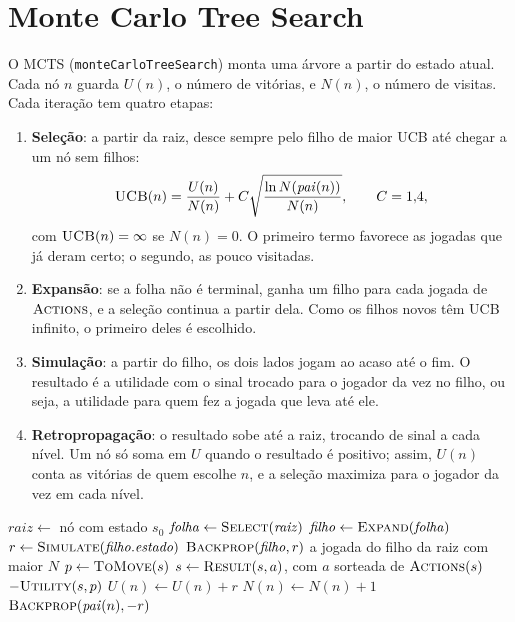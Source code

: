 \documentclass[11pt,a4paper]{article}
\begin{document}
\section{Monte Carlo Tree Search}\label{sec:mcts}

O MCTS (\texttt{monteCarloTreeSearch}) monta uma árvore a partir do estado
atual. Cada nó $n$ guarda $U(n)$, o número de vitórias, e $N(n)$, o número de
visitas. Cada iteração tem quatro etapas:

\begin{enumerate}
  \item \textbf{Seleção}: a partir da raiz, desce sempre pelo filho de maior
    UCB até chegar a um nó sem filhos:
    \[
    \textsc{UCB}(n) = \frac{U(n)}{N(n)} + C\sqrt{\frac{\ln N(\mathit{pai}(n))}{N(n)}},
    \qquad C = 1{,}4,
    \]
    com $\textsc{UCB}(n) = \infty$ se $N(n) = 0$. O primeiro termo favorece as
    jogadas que já deram certo; o segundo, as pouco visitadas.
  \item \textbf{Expansão}: se a folha não é terminal, ganha um filho para cada
    jogada de $\textsc{Actions}$, e a seleção continua a partir dela. Como os
    filhos novos têm UCB infinito, o primeiro deles é escolhido.
  \item \textbf{Simulação}: a partir do filho, os dois lados jogam ao acaso até
    o fim. O resultado é a utilidade com o sinal trocado para o jogador da vez
    no filho, ou seja, a utilidade para quem fez a jogada que leva até ele.
  \item \textbf{Retropropagação}: o resultado sobe até a raiz, trocando de
    sinal a cada nível. Um nó só soma em $U$ quando o resultado é positivo;
    assim, $U(n)$ conta as vitórias de quem escolhe $n$, e a seleção maximiza
    para o jogador da vez em cada nível.
\end{enumerate}

\begin{algorithm}[h]
\caption{Monte Carlo Tree Search (\texttt{monteCarloTreeSearch})}
\begin{algorithmic}[1]
  \State $\mathit{raiz} \gets$ nó com estado $s_0$
    \State $\mathit{folha} \gets \textsc{Select}(\mathit{raiz})$
    \State $\mathit{filho} \gets \textsc{Expand}(\mathit{folha})$
    \State $r \gets \textsc{Simulate}(\mathit{filho}.\mathit{estado})$
    \State $\textsc{Backprop}(\mathit{filho}, r)$
  \EndFor
  \State \Return a jogada do filho da raiz com maior $N$
\EndFunction
\Statex
{}
  \State $p \gets \textsc{ToMove}(s)$
    \State $s \gets \textsc{Result}(s, a)$, com $a$ sorteada de $\textsc{Actions}(s)$
  \EndWhile
  \State \Return $-\textsc{Utility}(s, p)$
\EndFunction
\Statex
{}
   $U(n) \gets U(n) + r$ \EndIf
  \State $N(n) \gets N(n) + 1$
   $\textsc{Backprop}(\mathit{pai}(n), -r)$ \EndIf
\EndFunction
\end{algorithmic}
\end{algorithm}
\end{document}
